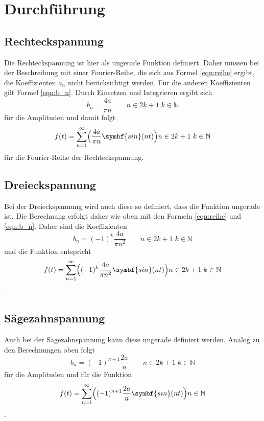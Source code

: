 \section{Durchführung}
\label{sec:Durchführung}
\subsection{Rechteckspannung}
Die Rechteckspannung ist hier als ungerade Funktion definiert.
Daher müssen bei der Beschreibung mit einer Fourier-Reihe, die sich aus Formel \ref{eqn:reihe} ergibt, die Koeffizienten $a_n$ nicht berücksichtigt werden.
Für die anderen Koeffizienten gilt Formel \ref{eqn:b_n}.
Durch Einsetzen und Integrieren ergibt sich 
\begin{equation}
    b_n=\frac{4a}{\pi n} \qquad n\in2k+1 \; k\in\mathbb{N}
    \label{eqn:amp_recht}
\end{equation}
für die Amplituden und damit folgt
\begin{equation}
    f(t)=\sum_{n=1}^{\infty}\Bigl( \frac{4a}{\pi n} \symbf{sin}(n t)\Bigr) n\in2k+1 \; k\in\mathbb{N}
    \label{eqn:recht}
\end{equation}
für die Fourier-Reihe der Rechteckspannung.

\subsection{Dreieckspannung}
Bei der Dreieckspannung wird auch diese so definiert, dass die Funktion ungerade ist.
Die Berechnung erfolgt daher wie oben mit den Formeln \ref{eqn:reihe} und \ref{eqn:b_n}.
Daher sind die Koeffizienten
\begin{equation}
    b_n=(-1)^k\frac{4a}{\pi n^2} \qquad n\in2k+1 \; k\in\mathbb{N}
    \label{eqn:amp_drei}
\end{equation}   
und die Funktion entspricht
\begin{equation}
    f(t)=\sum_{n=1}^{\infty}\Bigl((-1)^k \frac{4a}{ \pi n^2} \symbf{sin}(n t)\Bigr) n\in2k+1 \; k\in\mathbb{N}
    \label{eqn:drei}
\end{equation}.

\subsection{Sägezahnspannung}
Auch bei der Sägezahnspannung kann diese ungerade definiert werden.
Analog zu den Berechnungen oben folgt
\begin{equation}
    b_n=(-1)^{n+1}\frac{2a}{ n} \qquad n\in2k+1 \; k\in\mathbb{N}
    \label{eqn:amp_säge}
\end{equation} 
für die Amplituden und für die Funktion
\begin{equation}
    f(t)=\sum_{n=1}^{\infty}\Bigl( (-1)^{n+1}\frac{2a}{ n} \symbf{sin}(n t)\Bigr) n\in\mathbb{N}
    \label{eqn:drei}
\end{equation}.


